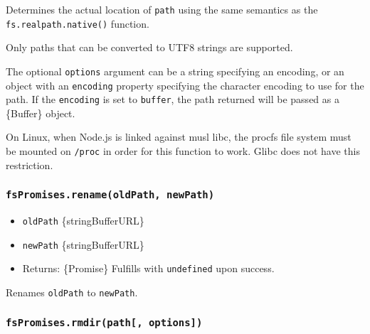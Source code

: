 Determines the actual location of \texttt{path} using the same semantics
as the \texttt{fs.realpath.native()} function.

Only paths that can be converted to UTF8 strings are supported.

The optional \texttt{options} argument can be a string specifying an
encoding, or an object with an \texttt{encoding} property specifying the
character encoding to use for the path. If the \texttt{encoding} is set
to \texttt{\textquotesingle{}buffer\textquotesingle{}}, the path
returned will be passed as a \{Buffer\} object.

On Linux, when Node.js is linked against musl libc, the procfs file
system must be mounted on \texttt{/proc} in order for this function to
work. Glibc does not have this restriction.

\subsubsection{\texorpdfstring{\texttt{fsPromises.rename(oldPath,\ newPath)}}{fsPromises.rename(oldPath, newPath)}}\label{fspromises.renameoldpath-newpath}

\begin{itemize}
\tightlist
\item
  \texttt{oldPath} \{string\textbar Buffer\textbar URL\}
\item
  \texttt{newPath} \{string\textbar Buffer\textbar URL\}
\item
  Returns: \{Promise\} Fulfills with \texttt{undefined} upon success.
\end{itemize}

Renames \texttt{oldPath} to \texttt{newPath}.

\subsubsection{\texorpdfstring{\texttt{fsPromises.rmdir(path{[},\ options{]})}}{fsPromises.rmdir(path{[}, options{]})}}\label{fspromises.rmdirpath-options}

